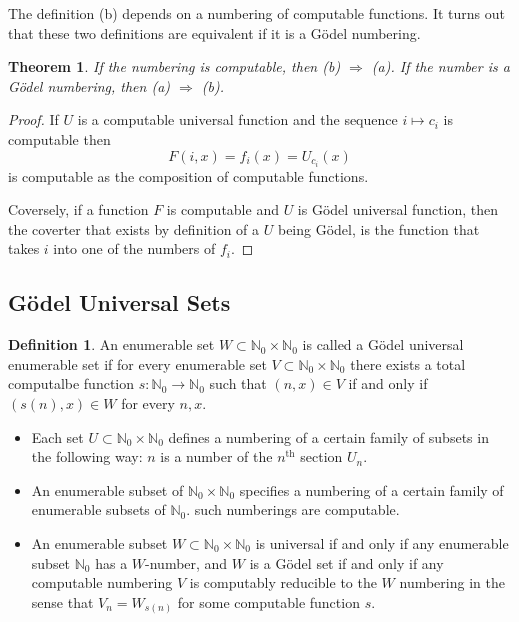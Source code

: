 \documentclass[10pt, letterpaper]{article}
\newcommand{\N}{\mathbb{N}}
\newtheorem{thm}{Theorem}
\theoremstyle{remark}
\theoremstyle{definition}
\newtheorem{defn}{Definition}
\begin{document}
The definition (b) depends on a numbering of computable functions. It turns out that these two definitions are 
equivalent if it is a G\"{o}del numbering.

\begin{thm}
    If the numbering is computable, then (b) $\Rightarrow$ (a). If the number is a G\"{o}del numbering, then (a) $\Rightarrow$ (b).
\end{thm}

\begin{proof}
    If $U$ is a computable universal function and the sequence $i \mapsto c_i$ is computable then 
    \[
        F(i,x) = f_i(x) = U_{c_i}(x)
    \]
    is computable as the composition of computable functions.

    Coversely, if a function $F$ is computable and $U$ is G\"{o}del universal function, then the coverter that 
    exists by definition of a $U$ being G\"{o}del, is the function that takes $i$ into one of the numbers of $f_i$.
\end{proof}

\subsection*{G\"{o}del Universal Sets}

\begin{defn}
    An enumerable set $W \subset \N_0 \times \N_0$ is called a G\"{o}del universal enumerable set if for every enumerable set 
$V \subset \N_0 \times \N_0$ there exists a total computalbe function $s:\N_0 \rightarrow \N_0$ such that 
$(n,x) \in V$ if and only if $(s(n), x) \in W$ for every $n,x$.
\end{defn}

\begin{itemize}
    \item Each set $U \subset \N_0 \times \N_0$ defines a numbering of a certain family of subsets in the following way: $n$ is a number 
of the $n^{\text{th}}$ section $U_n$.
    \item An enumerable subset of $\N_0 \times \N_0$ specifies a numbering of a certain family of enumerable subsets of $\N_0$.
    such numberings are computable.
    \item An enumerable subset $W \subset \N_0 \times \N_0$ is universal if and only if any enumerable subset $\N_0$ has a $W$-number, and $W$ is 
    a G\"{o}del set if and only if any computable numbering $V$ is computably reducible to the $W$ numbering in the sense that 
    $V_n = W_{s(n)}$ for some computable function $s$.
\end{itemize}
\end{document}
